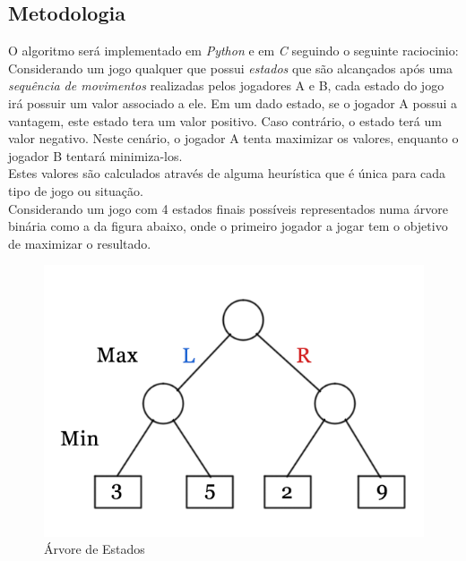 \documentclass[]{article}
\begin{document}
\subsection{Metodologia}
	O algoritmo será implementado em \emph{Python} e em \emph{C} seguindo o seguinte raciocinio: \cite{gfg}\\
	
	Considerando um jogo qualquer que possui \emph{estados} que são alcançados após uma \emph{sequência de movimentos} realizadas pelos jogadores A e B, cada estado do jogo irá possuir um valor associado a ele. Em um dado estado, se o jogador A possui a vantagem, este estado tera um valor positivo. Caso contrário, o estado terá um valor negativo. Neste cenário, o jogador A tenta maximizar os valores, enquanto o jogador B tentará minimiza-los. \\
	
	Estes valores são calculados através de alguma heurística que é única para cada tipo de jogo ou situação.\\
	
	Considerando um jogo com 4 estados finais possíveis representados numa árvore binária como a da figura abaixo, onde o primeiro jogador a jogar tem o objetivo de maximizar o resultado.
	
	\begin{figure}[H]
	\includegraphics[width=\linewidth]{gtt.png}
	\caption{Árvore de Estados \cite{gfg}}
	\label{fig:arvore1}
	\end{figure}
\end{document}
